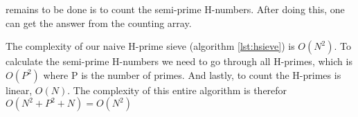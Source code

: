 \documentclass[11pt,a4paper,twoside]{article}
\begin{document}
 remains to be done is to count the semi-prime H-numbers. After
doing this, one can get the answer from the counting array.

The complexity of our naive H-prime sieve (algorithm \ref{lst:hsieve}) is
$O(N^2)$. To calculate the semi-prime H-numbers we need to go through all
H-primes, which is $O(P^2)$ where P is the number of primes. And lastly, to
count the H-primes is linear, $O(N)$. The complexity of this entire algorithm
is therefor $O(N^2 + P^2 + N) = O(N^2)$

\end{document}
